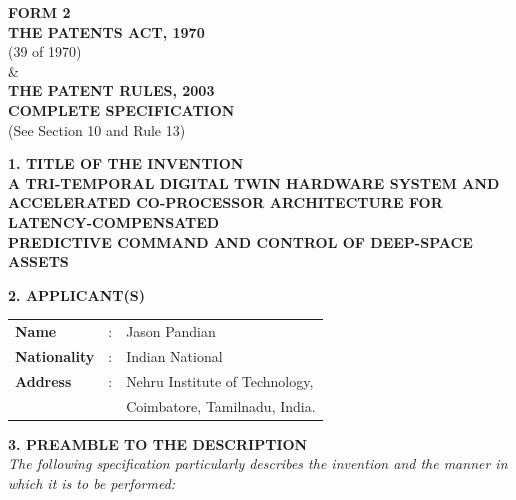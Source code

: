 \documentclass[12pt,a4paper]{article}
\begin{document}
\begin{center}
    \textbf{\large FORM 2} \\
    \vspace{0.3cm}
    \textbf{THE PATENTS ACT, 1970} \\
    (39 of 1970) \\
    \& \\
    \textbf{THE PATENT RULES, 2003} \\
    \vspace{0.5cm}
    \textbf{\large COMPLETE SPECIFICATION} \\
    (See Section 10 and Rule 13) \\
    \vspace{1cm}
    
    \textbf{\Large 1. TITLE OF THE INVENTION} \\
    \vspace{0.5cm}
    \textbf{\large A TRI-TEMPORAL DIGITAL TWIN HARDWARE SYSTEM AND \\ ACCELERATED CO-PROCESSOR ARCHITECTURE FOR LATENCY-COMPENSATED \\ PREDICTIVE COMMAND AND CONTROL OF DEEP-SPACE ASSETS} \\
    \vspace{1.5cm}
    
    \textbf{\Large 2. APPLICANT(S)} \\
    \vspace{0.5cm}
    \begin{tabular}{lll}
        \textbf{Name} & : & Jason Pandian \\
        \textbf{Nationality} & : & Indian National \\
        \textbf{Address} & : & Nehru Institute of Technology, \\
                         &   & Coimbatore, Tamilnadu, India. \\
    \end{tabular}
    \vspace{1.5cm}
    
    \textbf{\Large 3. PREAMBLE TO THE DESCRIPTION} \\
    \vspace{0.5cm}
    \textit{The following specification particularly describes the invention and the manner in which it is to be performed:}
\end{center}

\newpage
\end{document}
